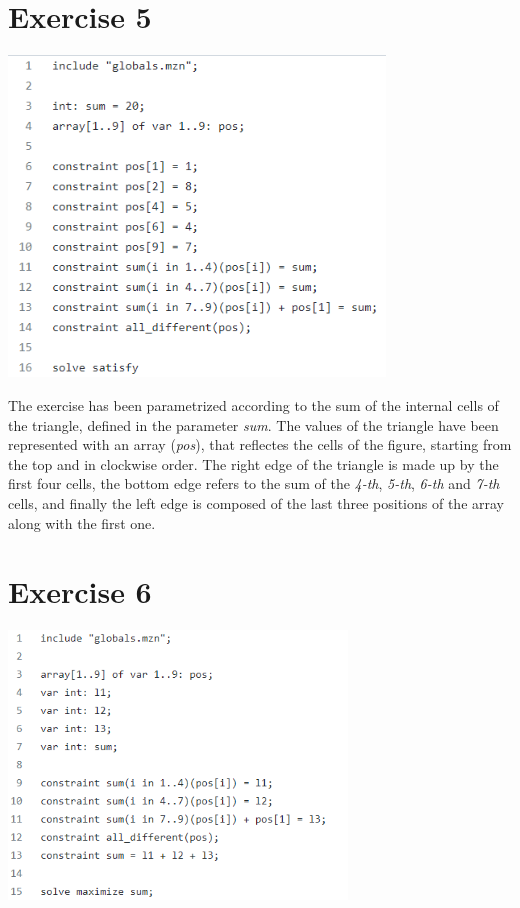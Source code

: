\documentclass{article}
\begin{document}
\section{Exercise 5}
\vspace{0.2cm}
\includegraphics[width=10cm]{img/Es5.png}
\vspace{0.2cm}

The exercise has been parametrized according to the sum of the internal cells of the triangle, defined
in the parameter \textit{sum}. The values of the triangle have been represented with an array (\textit{pos}),
that reflectes the cells of the figure, starting from the top and in clockwise order.
The right edge of the triangle is made up by the first four cells, the bottom edge refers to the sum of the
\textit{4-th}, \textit{5-th}, \textit{6-th} and \textit{7-th} cells, and finally the left edge is composed of
the last three positions of the array along with the first one.

\section{Exercise 6}
\vspace{0.2cm}
\includegraphics[width=9cm]{img/Es6.png}
\vspace{0.2cm}
\end{document}
